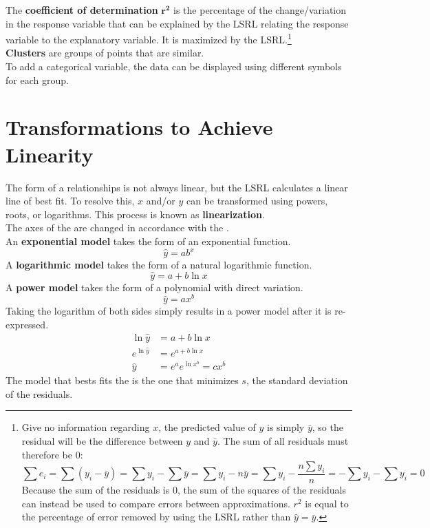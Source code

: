 \documentclass[../AP_Statistics.tex]{subfiles}
\begin{document}
			The \textbf{coefficient of determination} $\pmb{r^2}$ is the percentage of the change/variation in the response variable that can be explained by the LSRL relating the response variable to the explanatory variable. It is maximized by the LSRL.\footnote{Give no information regarding $x$, the predicted value of $y$ is simply $\bar{y}$, so the residual will be the difference between $y$ and $\bar{y}$. The sum of all residuals must therefore be 0:\[\sum e_i = \sum(y_i - \bar{y}) = \sum y_i - \sum \bar{y} = \sum y_i - n\bar{y} = \sum y_i - \frac{n\sum 
			y_i}{n} = - \sum y_i - \sum y_i = 0\]Because the sum of the residuals is 0, the sum of the squares of the residuals can instead be used to compare errors between approximations. $r^2$ is equal to the percentage of error removed by using the LSRL rather than $\hat{y} = \bar{y}$.} \\
			\textbf{Clusters}  are groups of points that are similar. \\
			To add a categorical variable, the data can be displayed using different symbols for each group. \\
		\section{Transformations to Achieve Linearity}
			The form of a relationships is not always linear, but the LSRL calculates a linear line of best fit. To resolve this, $x$ and/or $y$ can be transformed using powers, roots, or logarithms. This process is known as \textbf{linearization}. \\
			The axes of the  are changed in accordance with the . \\
			An \textbf{exponential model} takes the form of an exponential function.
			\[\hat{y} = ab^x\]
			A \textbf{logarithmic model} takes the form of a natural logarithmic function.
			\[\hat{y} = a + b\ln x\]
			A \textbf{power model} takes the form of a polynomial with direct variation.
			\[\hat{y} = ax^b\]
			Taking the logarithm of both sides simply results in a power model after it is re-expressed.
			\begin{align*}
				\ln \hat{y} &= a + b\ln x \\
				e^{\ln \hat{y}} &= e^{a + b\ln x} \\
				\hat{y} &= e^a e^{\ln x^b} = cx^b
			\end{align*}
			The model that bests fits the  is the one that minimizes $s$, the standard deviation of the residuals.
\end{document}
